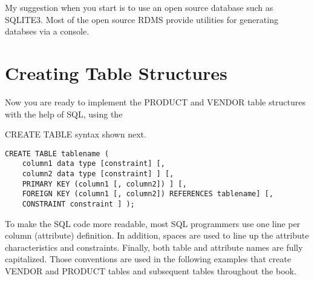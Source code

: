 My suggestion when you start is to use an open source database such as SQLITE3. Most of the open source RDMS provide utilities for generating databses via a console. 


\section{Creating Table Structures}

Now you are ready to implement the PRODUCT and VENDOR table structures with the help of SQL, using the

CREATE TABLE syntax shown next.

\begin{verbatim}
CREATE TABLE tablename (
    column1 data type [constraint] [,
    column2 data type [constraint] ] [,
    PRIMARY KEY (column1 [, column2]) ] [,
    FOREIGN KEY (column1 [, column2]) REFERENCES tablename] [,
    CONSTRAINT constraint ] );
\end{verbatim}    


To make the SQL code more readable, most SQL programmers use one line per column (attribute) definition. In addition,
spaces are used to line up the attribute characteristics and constraints. Finally, both table and attribute names are
fully capitalized. Those conventions are used in the following examples that create VENDOR and PRODUCT tables
and subsequent tables throughout the book.

